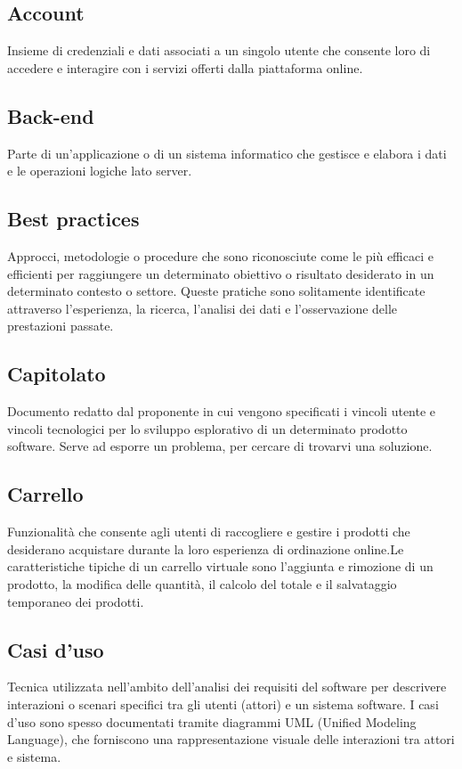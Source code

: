 
\subsection{Account}Insieme di credenziali e dati associati a un singolo utente che consente loro di accedere e interagire con i servizi offerti dalla piattaforma online.
\subsection{Back-end}Parte di un'applicazione o di un sistema informatico che gestisce e elabora i dati e le operazioni logiche lato server.
\subsection{Best practices}Approcci, metodologie o procedure che sono riconosciute come le più efficaci e efficienti per raggiungere un determinato obiettivo o risultato desiderato in un determinato contesto o settore. Queste pratiche sono solitamente identificate attraverso l'esperienza, la ricerca, l'analisi dei dati e l'osservazione delle prestazioni passate.
\subsection{Capitolato}Documento redatto dal proponente in cui vengono specificati i vincoli utente e vincoli tecnologici per lo sviluppo esplorativo di un determinato prodotto software. Serve ad esporre un problema, per cercare di trovarvi una soluzione.
\subsection{Carrello}Funzionalità che consente agli utenti di raccogliere e gestire i prodotti che desiderano acquistare durante la loro esperienza di ordinazione online.Le caratteristiche tipiche di un carrello virtuale sono l'aggiunta e rimozione di un prodotto, la modifica delle quantità, il calcolo del totale e il salvataggio temporaneo dei prodotti.
\subsection{Casi d’uso}Tecnica utilizzata nell'ambito dell'analisi dei requisiti del software per descrivere interazioni o scenari specifici tra gli utenti (attori) e un sistema software. I casi d'uso sono spesso documentati tramite diagrammi UML (Unified Modeling Language), che forniscono una rappresentazione visuale delle interazioni tra attori e sistema.
